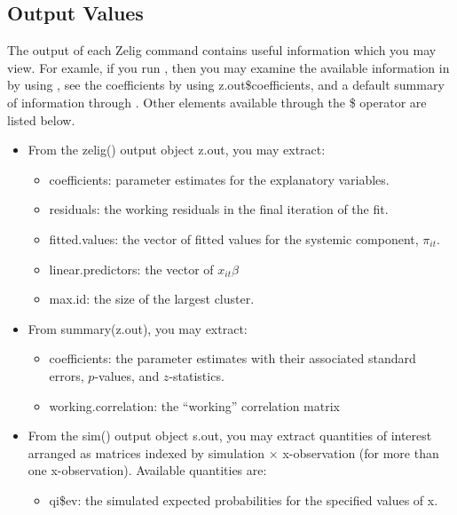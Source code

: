 \documentclass[letterpaper,10pt,english]{sphinxmanual}
\begin{document}
\subsection{Output Values}
\label{vignette:id130}
The output of each Zelig command contains useful information which you
may view. For examle, if you run
, then you may
examine the available information in  by using
, see the coefficients by using z.out\$coefficients, and
a default summary of information through . Other
elements available through the \$ operator are listed below.
\begin{itemize}
\item {} 
From the zelig() output object z.out, you may extract:
\begin{itemize}
\item {} 
coefficients: parameter estimates for the explanatory variables.

\item {} 
residuals: the working residuals in the final iteration of the
fit.

\item {} 
fitted.values: the vector of fitted values for the systemic
component, \(\pi_{it}\).

\item {} 
linear.predictors: the vector of \(x_{it}\beta\)

\item {} 
max.id: the size of the largest cluster.

\end{itemize}

\item {} 
From summary(z.out), you may extract:
\begin{itemize}
\item {} 
coefficients: the parameter estimates with their associated
standard errors, \(p\)-values, and \(z\)-statistics.

\item {} 
working.correlation: the “working” correlation matrix

\end{itemize}

\item {} 
From the sim() output object s.out, you may extract quantities of
interest arranged as matrices indexed by simulation \(\times\)
x-observation (for more than one x-observation). Available quantities
are:
\begin{itemize}
\item {} 
qi\$ev: the simulated expected probabilities for the specified
values of x.


\end{itemize}
\end{itemize}
\end{document}
